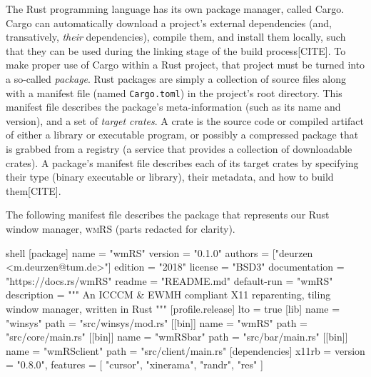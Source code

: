 
The Rust programming  language has its own package manager,  called Cargo. Cargo
can automatically download a project's external dependencies (and, transatively,
\textit{their} dependencies), compile them, and  install them locally, such that
they can be  used during the linking  stage of the build  process[CITE]. To make
proper use of  Cargo within a Rust  project, that project must be  turned into a
so-called  \textit{package}. Rust  packages are  simply a  collection of  source
files along  with a manifest  file (named \texttt{Cargo.toml}) in  the project's
root  directory. This  manifest  file describes  the package's  meta-information
(such as its name and version), and  a set of \textit{target crates}. A crate is
the source code or compiled artifact  of either a library or executable program,
or possibly a compressed package that is grabbed from a registry (a service that
provides  a  collection  of  downloadable crates).  A  package's  manifest  file
describes each of its target crates  by specifying their type (binary executable
or library), their metadata, and how to build them[CITE].

The  following manifest  file describes  the  package that  represents our  Rust
window manager, \textsc{wmRS} (parts redacted for clarity).

\begin{mintedblock}{shell}
  [package]
  name = "wmRS"
  version = "0.1.0"
  authors = ["deurzen <m.deurzen@tum.de>"]
  edition = "2018"
  license = "BSD3"
  documentation = "https://docs.rs/wmRS"
  readme = "README.md"
  default-run = "wmRS"
  description = """
  An ICCCM & EWMH compliant X11 reparenting,
  tiling window manager, written in Rust
  """
  [profile.release]
  lto = true
  [lib]
  name = "winsys"
  path = "src/winsys/mod.rs"
  [[bin]]
  name = "wmRS"
  path = "src/core/main.rs"
  [[bin]]
  name = "wmRSbar"
  path = "src/bar/main.rs"
  [[bin]]
  name = "wmRSclient"
  path = "src/client/main.rs"
  [dependencies]
  x11rb = {
    version = "0.8.0",
    features = [
      "cursor",
      "xinerama",
      "randr",
      "res"
    ]
  }
\end{mintedblock}


